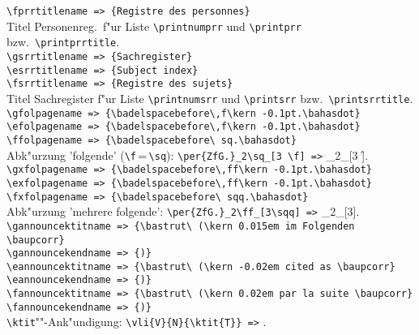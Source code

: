 \documentclass[12pt,a4paper]{article}
\begin{document}
{\verb|\fprrtitlename => {Registre des personnes}| \\[-.2ex]
Titel Personenreg.\ f"ur Liste \verb|\printnumprr| und \verb|\printprr| bzw.\ \verb|\printprrtitle|.
\\[.8ex]%
\verb|\gsrrtitlename => {Sachregister}| \\[-.8ex]
\verb|\esrrtitlename => {Subject index}| \\[-.8ex]
\verb|\fsrrtitlename => {Registre des sujets}| \\[-.2ex]
Titel Sachregister f"ur Liste \verb|\printnumsrr| und \verb|\printsrr| bzw.\ \verb|\printsrrtitle|.
\\[.8ex]%
\verb|\gfolpagename => {\badelspacebefore\,f\kern -0.1pt.\bahasdot}| \\[-.8ex]
\verb|\efolpagename => {\badelspacebefore\,f\kern -0.1pt.\bahasdot}| \\[-.8ex]
\verb|\ffolpagename => {\badelspacebefore\ sq.\bahasdot}| \\[-.2ex]
Abk"urzung 'folgende' (\verb|\f|\,=\,\verb|\sq|): \verb|\per{ZfG.}_2\sq_[3 \f] =>| _2\sq_[3 \f].
\\[.8ex]%
\verb|\gxfolpagename => {\badelspacebefore\,ff\kern -0.1pt.\bahasdot}| \\[-.8ex]
\verb|\exfolpagename => {\badelspacebefore\,ff\kern -0.1pt.\bahasdot}| \\[-.8ex]
\verb|\fxfolpagename => {\badelspacebefore\ sqq.\bahasdot}| \\[-.2ex]
Abk"urzung 'mehrere folgende': \verb|\per{ZfG.}_2\ff_[3\sqq] =>| _2\ff_[3\sqq].
\\[2.5ex]%
\verb|\gannouncektitname => |{\footnotesize\verb|{\bastrut\ (\kern 0.015em im Folgenden \baupcorr}|} \\[-.4ex]
\hspace*{5cm} \verb|\gannouncekendname => {)}| \\[-.4ex]
\verb|\eannouncektitname => |{\footnotesize\verb|{\bastrut\ (\kern -0.02em cited as \baupcorr}|} \\[-.4ex]
\hspace*{5cm} \verb|\eannouncekendname => {)}| \\[-.4ex]
\verb|\fannouncektitname => |{\footnotesize\verb|{\bastrut\ (\kern 0.02em par la suite \baupcorr}|} \\[-.4ex]
\hspace*{5cm} \verb|\fannouncekendname => {)}| \\[.2ex]
\verb|\ktit|""-Ank"undigung: \verb|\vli{V}{N}{\ktit{T}} =>| {\notktitaddtok{}}.
}
\end{document}
